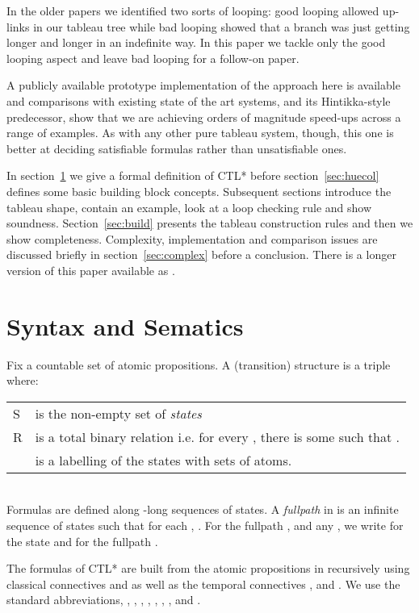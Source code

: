 \documentclass[submission,copyright,creativecommons]{eptcs}
\newcommand{\mnp}{
}
\begin{document}
In the older papers
we identified two sorts of looping:
good looping allowed up-links in our tableau tree
while
bad looping 
showed that a branch was just getting longer and
longer in an indefinite way.
In this paper we
tackle only the good looping aspect
and 
leave bad looping for a follow-on paper.

A publicly available prototype implementation of the
approach here is available
and 
comparisons 
with existing state of the art systems,
and its Hintikka-style predecessor,
show that
we are achieving orders of magnitude
speed-ups across
a range of examples.
As with any other pure tableau system, though,
this one is better at deciding satisfiable formulas
rather than unsatisfiable ones.

In section~\ref{sec:synsem} we give
a formal definition of CTL*
before section~\ref{sec:huecol} defines some basic building block concepts.
Subsequent sections
introduce the tableau shape,
 contain an example,
look at a loop checking rule and show soundness.
Section~\ref{sec:build} presents the tableau construction rules
and then we show
completeness.
Complexity, implementation and comparison
issues are discussed
briefly in section~\ref{sec:complex}
before a conclusion.
There is a longer version of this paper
available as \cite{Rey:fasttablong}.


\mnp

\section{Syntax and Sematics}
\label{sec:synsem}

Fix a countable set 
of atomic propositions.
A (transition)  structure is a triple 
where:\\
\begin{tabular}{ll}
S & is the non-empty set of {\em states}\\
R & is a total binary relation 
 i.e. for every , there is some  such that
    .\\
 &  is a labelling of the
states with sets of atoms.\\
\end{tabular}\\

Formulas are defined along -long sequences
of states.
A {\em fullpath} in  is an infinite sequence
 of states such that
for each ,  .
For the fullpath
,
and any , we write
 for the state  and
 for the fullpath
.


The formulas of CTL* are built from the
atomic propositions in  recursively
using classical connectives  and  as
well as the temporal connectives
,  and .
We use the standard abbreviations, , 
, ,
,  , 
,
, 
and .
\end{document}
